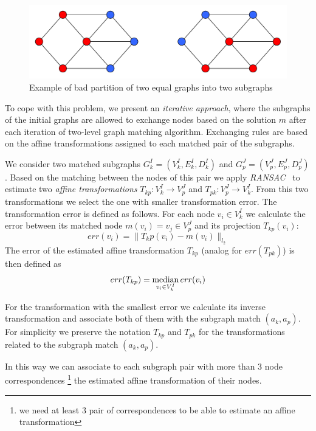 \begin{figure}
	\centering
	\includegraphics[scale=0.35]{chapter2/fig/badpartition.pdf}
	\caption{Example of bad partition of two equal graphs into two subgraphs} \label{fig:badpartition}
\end{figure}


To cope with this problem, we present an \emph{iterative approach}, where the subgraphs of the initial graphs are allowed to exchange nodes based on the solution $m$ after each iteration of two-level graph matching algorithm. Exchanging rules are based on the affine transformations assigned to each matched pair of the subgraphs.

We consider two matched subgraphs $G^I_k=(V^I_k, E^I_k, D^I_k)$ and  $G^J_p=(V^J_p, E^J_p, D^J_p)$. Based on the matching between the nodes of this pair we apply \emph{RANSAC}~\cite{RANSAC} to estimate two \emph{affine transformations} $T_{kp}:V^I_k\rightarrow V^J_p$ and $T_{pk}:V^J_p\rightarrow V^I_k$. From this two transformations we select the one with smaller transformation error. The transformation error is defined as follows. For each node $v_i\in V^I_k$ we calculate the error between its matched node $m(v_i) = v_j\in V^J_p$ and its projection $T_{kp}(v_i)$: 
\begin{equation} \label{eq:err_v}
err(v_i) = \|T_kp(v_i) - m(v_i)\|_{l_2}
\end{equation}
The error of the estimated affine transformation $T_{kp}$ (analog for  $err(T_{pk})$) is then defined as
\begin{equation} \label{eq:err_T}
err(T_{kp}) = \mathop{\rm median}_{v_i\in V^I_k}err(v_i)
\end{equation}

For the transformation with the smallest error we calculate its inverse transformation and associate both of them with the subgraph match $(a_k, a_p)$. For simplicity we preserve the notation $T_{kp}$ and $T_{pk}$ for the transformations related to the subgraph match $(a_k, a_p)$.

In this way we can associate to each subgraph pair with more than $3$ node correspondences \footnote{we need at least $3$ pair of correspondences to be able to estimate an affine transformation} the estimated affine transformation of their nodes.

